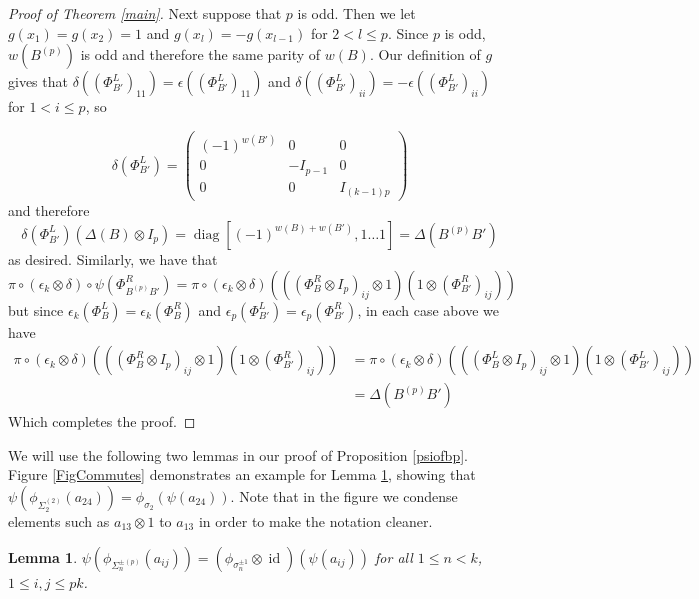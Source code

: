 \documentclass{amsart}[11pt,fullpage]
\def\s{{\sigma}}
\newcommand\id{\operatorname{id}}
\newcommand\diag{\operatorname{diag}}
\newcommand\SpPm{\Sigma^{\pm(p)}}
\newtheorem{lem}[thm]{Lemma}
\theoremstyle{definition}
\begin{document}
\begin{proof}[Proof of Theorem \ref{main}]
Next suppose that $p$ is odd. Then we let $g(x_1) = g(x_2) = 1$ and $g(x_l) = -g(x_{l-1})$ for $2<l\le p$. Since $p$ is odd, $w(B^{(p)})$ is odd and therefore the same parity of $w(B)$. Our definition of $g$ gives that $\delta\left(\left(\Phi_{B'}^L\right)_{11}\right) = \epsilon\left(\left(\Phi_{B'}^L\right)_{11}\right)$ and $\delta\left(\left(\Phi_{B'}^L\right)_{ii}\right) = -\epsilon\left(\left(\Phi_{B'}^L\right)_{ii}\right)$ for $1<i\le p$, so 

$$\delta\left(\Phi_{B'}^L\right) = 
\left( \begin{array}{ccc}
(-1)^{w(B')} & 0 & 0 \\
0 & -I_{p-1} & 0 \\
0 & 0 & I_{(k-1)p} \end{array} \right)
$$
\noindent and therefore
$$
\delta\left(\Phi_{B'}^L\right)\left(\Delta(B)\otimes I_p\right)= \diag[(-1)^{w(B) + w(B')},1\ldots 1] = \Delta(B^{(p)}B')
$$
\noindent as desired. Similarly, we have that
$$
\pi\circ(\epsilon_k\otimes\delta)\circ\psi\left(\Phi_{B^{(p)}B'}^R\right) = \pi\circ(\epsilon_k\otimes\delta)\left(\left(\left(\Phi_B^R\otimes I_p\right)_{ij}\otimes 1\right)\left(1\otimes \left(\Phi_{B'}^R\right)_{ij}\right)\right)
$$
but since $\epsilon_k\left(\Phi_B^L\right) = \epsilon_k\left(\Phi_B^R\right)$ and $\epsilon_p\left(\Phi_{B'}^L\right) = \epsilon_p\left(\Phi_{B'}^R\right)$, in each case above we have
\begin{align*}
\pi\circ(\epsilon_k\otimes\delta)\left(\left(\left(\Phi_B^R\otimes I_p\right)_{ij}\otimes 1\right)\left(1\otimes \left(\Phi_{B'}^R\right)_{ij}\right)\right) &= \pi\circ(\epsilon_k\otimes\delta)\left(\left(\left(\Phi_B^L\otimes I_p\right)_{ij}\otimes 1\right)\left(1\otimes \left(\Phi_{B'}^L\right)_{ij}\right)\right)\\
&= \Delta\left(B^{(p)}B'\right)
\end{align*}
Which completes the proof.
\end{proof}


\noindent We will use the following two lemmas in our proof of Proposition \ref{psiofbp}. Figure \ref{FigCommutes} demonstrates an example for Lemma \ref{commutes}, showing that $\psi(\phi_{\Sigma^{(2)}_2}(a_{24})) = \phi_{\s_2}(\psi(a_{24}))$. Note that in the figure we condense elements such as $a_{13}\otimes 1$ to $a_{13}$ in order to make the notation cleaner.


\begin{lem}\label{commutes}
$\psi(\phi_{\SpPm_n}(a_{ij})) = (\phi_{\s_n^{\pm 1}} \otimes \id)(\psi(a_{ij}))$ for all $1\le n < k$, $1 \le i,j \le pk$.
\end{lem}
\end{document}
